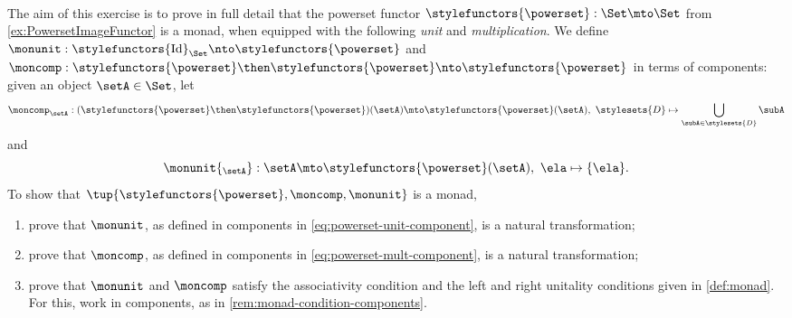 \

\begin{gradedexercise}\label{ex:PowersetMonad}
The aim of this exercise is to prove in full detail that the powerset functor $\stylefunctors{\powerset} : \Set \mto \Set$ from \cref{ex:PowersetImageFunctor} is a monad, when equipped with the following \emph{unit} and \emph{multiplication}. We define $\monunit : \stylefunctors{\text{Id}}_{\Set}  \nto \stylefunctors{\powerset}$ and $\moncomp : \stylefunctors{\powerset} \then \stylefunctors{\powerset} \nto \stylefunctors{\powerset}$ in terms of components: given an object $\setA \in \Set$, let 
\begin{equation}\label{eq:powerset-mult-component}
\moncomp_{\setA} : (\stylefunctors{\powerset} \then \stylefunctors{\powerset})(\setA) \mto \stylefunctors{\powerset}(\setA), \ \stylesets{D} \mapsto \bigcup_{\subA \in \stylesets{D}} \subA
\end{equation}
and 
\begin{equation}\label{eq:powerset-unit-component}
\monunit{_\setA} : \setA \mto \stylefunctors{\powerset}(\setA), \ \ela \mapsto \{ \ela \}.
\end{equation}
To show that $\tup{\stylefunctors{\powerset}, \moncomp, \monunit}$ is a monad, 
\begin{enumerate}
\item prove that $\monunit$, as defined in components in \cref{eq:powerset-unit-component}, is a natural transformation; 
\item prove that $\moncomp$, as defined in components in \cref{eq:powerset-mult-component}, is a natural transformation; 
\item prove that $\monunit$ and $\moncomp$ satisfy the associativity condition and the left and right unitality conditions given in \cref{def:monad}. For this, work in components, as in \cref{rem:monad-condition-components}.
\end{enumerate}
\end{gradedexercise}








